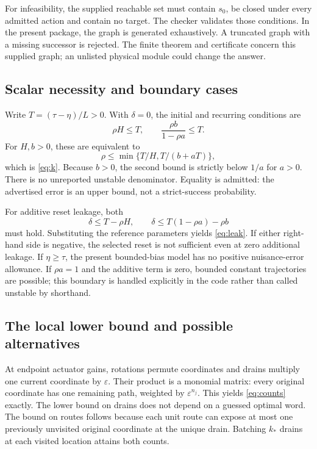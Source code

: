 \documentclass[11pt,letterpaper]{article}
\theoremstyle{definition}\newtheorem{definition}[theorem]{Definition}
\theoremstyle{remark}\newtheorem{remark}[theorem]{Remark}
\begin{document}
For infeasibility, the supplied reachable set must contain $s_0$, be closed under every admitted action and contain no target. The checker validates those conditions. In the present package, the graph is generated exhaustively. A truncated graph with a missing successor is rejected. The finite theorem and certificate concern this supplied graph; an unlisted physical module could change the answer.

\subsection{Scalar necessity and boundary cases}
Write $T=(\tau-\eta)/L>0$. With $\delta=0$, the initial and recurring conditions are
\begin{equation}
 \rho H\leq T,\qquad \frac{\rho b}{1-\rho a}\leq T.
\end{equation}
For $H,b>0$, these are equivalent to
\begin{equation}
 \rho\leq\min\{T/H,T/(b+aT)\},
\end{equation}
which is \eqref{eq:k}. Because $b>0$, the second bound is strictly below $1/a$ for $a>0$. There is no unreported unstable denominator. Equality is admitted: the advertised error is an upper bound, not a strict-success probability.

For additive reset leakage, both
\begin{equation}
 \delta\leq T-\rho H,\qquad
 \delta\leq T(1-\rho a)-\rho b
\end{equation}
must hold. Substituting the reference parameters yields \eqref{eq:leak}. If either right-hand side is negative, the selected reset is not sufficient even at zero additional leakage. If $\eta\geq\tau$, the present bounded-bias model has no positive nuisance-error allowance. If $\rho a=1$ and the additive term is zero, bounded constant trajectories are possible; this boundary is handled explicitly in the code rather than called unstable by shorthand.

\subsection{The local lower bound and possible alternatives}
At endpoint actuator gains, rotations permute coordinates and drains multiply one current coordinate by $\varepsilon$. Their product is a monomial matrix: every original coordinate has one remaining path, weighted by $\varepsilon^{n_j}$. This yields \eqref{eq:counts} exactly. The lower bound on drains does not depend on a guessed optimal word. The bound on routes follows because each unit route can expose at most one previously unvisited original coordinate at the unique drain. Batching $k_*$ drains at each visited location attains both counts.
\end{document}
